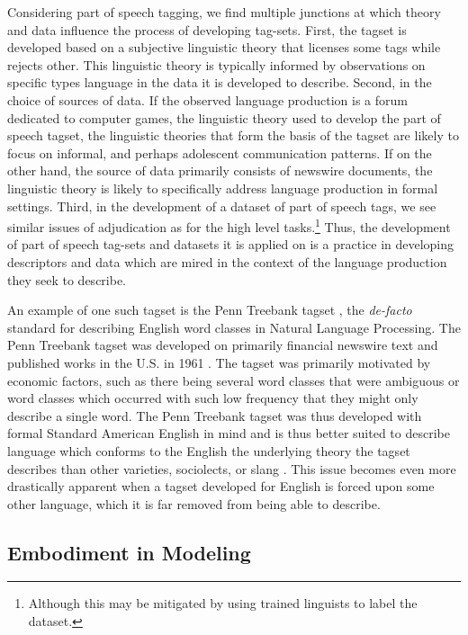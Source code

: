 Considering part of speech tagging, we find multiple junctions at which theory and data influence the process of developing tag-sets. First, the tagset is developed based on a subjective linguistic theory that licenses some tags while rejects other. This linguistic theory is typically informed by observations on specific types language in the data it is developed to describe. Second, in the choice of sources of data. If the observed language production is a forum dedicated to computer games, the linguistic theory used to develop the part of speech tagset, the linguistic theories that form the basis of the tagset are likely to focus on informal, and perhaps adolescent communication patterns. If on the other hand, the source of data primarily consists of newswire documents, the linguistic theory is likely to specifically address language production in formal settings. Third, in the development of a dataset of part of speech tags, we see similar issues of adjudication as for the high level tasks.\footnote{Although this may be mitigated by using trained linguists to label the dataset.}
Thus, the development of part of speech tag-sets and datasets it is applied on is a practice in developing descriptors and data which are mired in the context of the language production they seek to describe.

An example of one such tagset is the Penn Treebank tagset \cite{Marcus:1993}, the \textit{de-facto} standard for describing English word classes in Natural Language Processing. The Penn Treebank tagset was developed on primarily financial newswire text and published works in the U.S. in 1961 \cite{Francis:1982}. The tagset was primarily motivated by economic factors, such as there being several word classes that were ambiguous or word classes which occurred with such low frequency that they might only describe a single word. The Penn Treebank tagset was thus developed with formal Standard American English in mind and is thus better suited to describe language which conforms to the English the underlying theory the tagset describes than other varieties, sociolects, or slang \cite{Jorgensen:2016}.
This issue becomes even more drastically apparent when a tagset developed for English is forced upon some other language, which it is far removed from being able to describe.

\subsection{Embodiment in Modeling}

